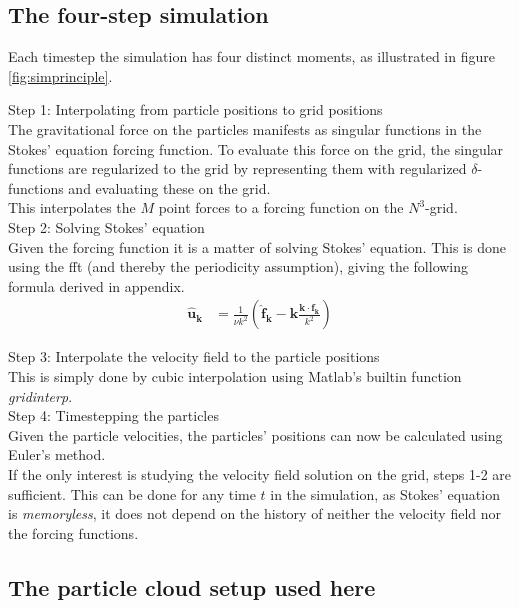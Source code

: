 \documentclass[a4paper,twoside=false,abstract=false,numbers=noenddot,
titlepage=false,headings=small,parskip=half,version=last]{scrartcl}
\begin{document}
\subsection{The four-step simulation}

Each timestep the simulation has four distinct moments, as illustrated in figure \ref{fig:simprinciple}.

Step 1: Interpolating from particle positions to grid positions\\
The gravitational force on the particles manifests as singular functions in the Stokes' equation forcing function. To evaluate this force on the grid, the singular functions are regularized to the grid by representing them with regularized $\delta$-functions and evaluating these on the grid.\\ This interpolates the $M$ point forces to a forcing function on the $N^3$-grid.\\
Step 2: Solving Stokes' equation\\
Given the forcing function it is a matter of solving Stokes' equation. This is done using the fft (and thereby the periodicity assumption), giving the following formula derived in appendix.\\
\begin{align}
\hat{\mathbf{u}}_\mathbf{k} &= \frac{1}{\nu k^2} \left( \hat{\mathbf{f}}_\mathbf{k} - \mathbf{k} \frac{\mathbf{k}\cdot \hat{\mathbf{f}}_\mathbf{k}}{k^2} \right)
\end{align}

Step 3: Interpolate the velocity field to the particle positions\\
This is simply done by cubic interpolation using Matlab's builtin function \emph{gridinterp}.\\
Step 4: Timestepping the particles\\
Given the particle velocities, the particles' positions can now be calculated using Euler's method.\\

If the only interest is studying the velocity field solution on the grid, steps 1-2 are sufficient. This can be done for any time $t$ in the simulation, as Stokes' equation is \emph{memoryless}, it does not depend on the history of neither the velocity field nor the forcing functions.

\subsection{The particle cloud setup used here}
\end{document}
